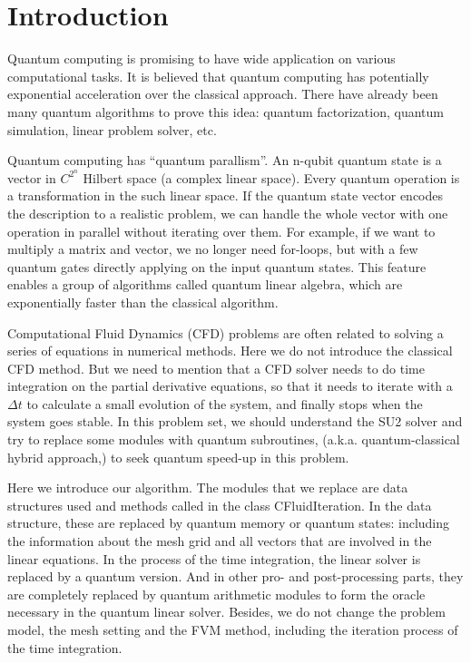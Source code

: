 \documentclass[%
 reprint,
 amsmath,amssymb,
pra,
]{revtex4-1}
\begin{document}

\maketitle

\section{Introduction}
Quantum computing is promising to have wide application on various computational tasks. It is believed that quantum computing has potentially exponential acceleration over the classical approach. There have already been many quantum algorithms to prove this idea: quantum factorization, quantum simulation, linear problem solver, etc. 

Quantum computing has “quantum parallism”. An n-qubit quantum state is a vector in $C^{2^n}$ Hilbert space (a complex linear space). Every quantum operation is a transformation in the such linear space. If the quantum state vector encodes the description to a realistic problem, we can handle the whole vector with one operation in parallel without iterating over them. For example, if we want to multiply a matrix and vector, we no longer need for-loops, but with a few quantum gates directly applying on the input quantum states. This feature enables a group of algorithms called quantum linear algebra, which are exponentially faster than the classical algorithm.

Computational Fluid Dynamics (CFD) problems are often related to solving a series of equations in numerical methods. Here we do not introduce the classical CFD method. But we need to mention that a CFD solver needs to do time integration on the partial derivative equations, so that it needs to iterate with a $\Delta t$ to calculate a small evolution of the system, and finally stops when the system goes stable. In this problem set, we should understand the SU2 solver and try to replace some modules with quantum subroutines, (a.k.a. quantum-classical hybrid approach,) to seek quantum speed-up in this problem.

Here we introduce our algorithm. The modules that we replace are data structures used and methods called in the class CFluidIteration. In the data structure, these are replaced by quantum memory or quantum states: including the information about the mesh grid and all vectors that are involved in the linear equations. In the process of the time integration, the linear solver is replaced by a quantum version. And in other pro- and post-processing parts, they are completely replaced by quantum arithmetic modules to form the oracle necessary in the quantum linear solver. Besides, we do not change the problem model, the mesh setting and the FVM method, including the iteration process of the time integration. 
\end{document}
